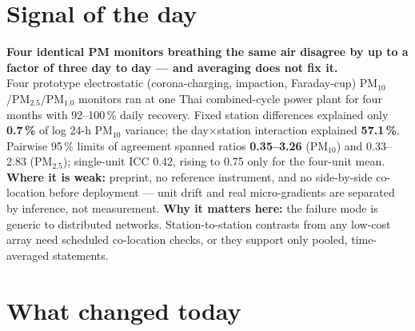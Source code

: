\documentclass[10pt]{article}
\begin{document}
\vspace{6mm}

\section*{\sffamily\bfseries\color{Deep}Signal of the day}
\vspace{-1.5mm}{\color{Amber}\rule{\linewidth}{1.1pt}}\vspace{2.5mm}

\begin{keybox}
{\sffamily\bfseries\small\color{Deep}Four identical PM monitors breathing the same air disagree by up to a
factor of three day to day --- and averaging does not fix it.}\\[1.4mm]
\footnotesize
Four prototype electrostatic (corona-charging, impaction, Faraday-cup) PM$_{10}$/PM$_{2.5}$/PM$_{1.0}$ monitors ran
at one Thai combined-cycle power plant for four months with 92--100\,\% daily recovery. Fixed station differences
explained only \textbf{0.7\,\%} of log 24-h PM$_{10}$ variance; the day$\times$station interaction explained
\textbf{57.1\,\%}. Pairwise 95\,\% limits of agreement spanned ratios \textbf{0.35--3.26} (PM$_{10}$) and
0.33--2.83 (PM$_{2.5}$); single-unit ICC 0.42, rising to 0.75 only for the four-unit mean.
\textbf{Where it is weak:} preprint, no reference instrument, and no side-by-side co-location before deployment ---
unit drift and real micro-gradients are separated by inference, not measurement.
\textbf{Why it matters here:} the failure mode is generic to distributed networks. Station-to-station contrasts
from any low-cost array need scheduled co-location checks, or they support only pooled, time-averaged statements.\par
\end{keybox}

\vspace{3mm}

\section*{\sffamily\bfseries\color{Deep}What changed today}
\vspace{-1.5mm}{\color{Amber}\rule{\linewidth}{1.1pt}}\vspace{2.5mm}
\end{document}
